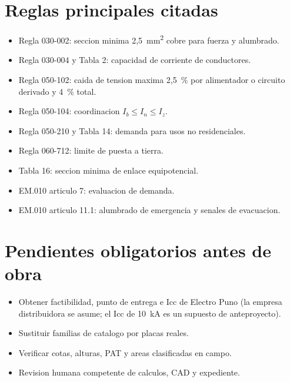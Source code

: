 \section{Reglas principales citadas}
\begin{itemize}
\item Regla 030-002: seccion minima 2,5~mm\textsuperscript{2} cobre para fuerza y alumbrado.
\item Regla 030-004 y Tabla 2: capacidad de corriente de conductores.
\item Regla 050-102: caida de tension maxima 2,5~\% por alimentador o circuito derivado y 4~\% total.
\item Regla 050-104: coordinacion \(I_b \leq I_n \leq I_z\).
\item Regla 050-210 y Tabla 14: demanda para usos no residenciales.
\item Regla 060-712: limite de puesta a tierra.
\item Tabla 16: seccion minima de enlace equipotencial.
\item EM.010 articulo 7: evaluacion de demanda.
\item EM.010 articulo 11.1: alumbrado de emergencia y senales de evacuacion.
\end{itemize}

\section{Pendientes obligatorios antes de obra}
\begin{itemize}
\item Obtener factibilidad, punto de entrega e Icc de Electro Puno (la empresa
      distribuidora se asume; el Icc de 10~kA es un supuesto de anteproyecto).
\item Sustituir familias de catalogo por placas reales.
\item Verificar cotas, alturas, PAT y areas clasificadas en campo.
\item Revision humana competente de calculos, CAD y expediente.
\end{itemize}
